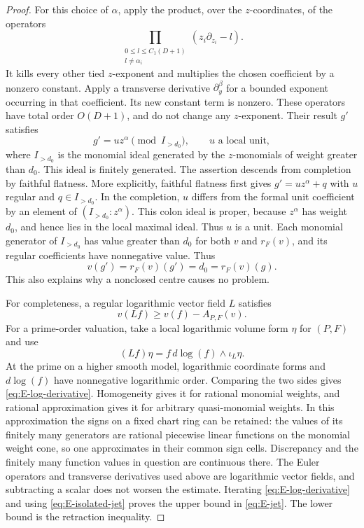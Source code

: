 \begin{proof}
For this choice of $\alpha$, apply the product, over the $z$-coordinates,
of the operators
\[
 \prod_{\substack{0\le l\le C_1(D+1)\\ l\ne\alpha_i}}
             (z_i\partial_{z_i}-l).
\]
It kills every other tied $z$-exponent and multiplies the chosen
coefficient by a nonzero constant. Apply a transverse derivative
$\partial_y^\beta$ for a bounded exponent occurring in that coefficient.
Its new constant term is nonzero. These operators have total order
$O(D+1)$, and do not change any $z$-exponent. Their result $g'$ satisfies
\begin{equation}\label{eq:E-isolated-jet}
 g'=u z^\alpha\pmod{I_{>d_0}},\qquad u\text{ a local unit},
\end{equation}
where $I_{>d_0}$ is the monomial ideal generated by the $z$-monomials
of weight greater than $d_0$. This ideal is finitely generated.
The assertion descends from completion by faithful flatness. More
explicitly, faithful flatness first gives $g'=u z^\alpha+q$ with
$u$ regular and $q\in I_{>d_0}$. In the completion, $u$ differs from
the formal unit coefficient by an element of $(I_{>d_0}:z^\alpha)$.
This colon ideal is proper, because $z^\alpha$ has weight $d_0$,
and hence lies in the local maximal ideal. Thus $u$ is a unit.
Each monomial generator of $I_{>d_0}$ has value greater than $d_0$
for both $v$ and $r_F(v)$, and its regular coefficients have nonnegative
value. Thus
\[
 v(g')=r_F(v)(g')=d_0=r_F(v)(g).
\]
This also explains why a nonclosed centre causes no problem.

For completeness, a regular logarithmic vector field $L$ satisfies
\begin{equation}\label{eq:E-log-derivative}
 v(Lf)\ge v(f)-A_{P,F}(v).
\end{equation}
For a prime-order valuation, take a local logarithmic volume form
$\eta$ for $(P,F)$ and use
\[
 (Lf)\eta=f\,d\log(f)\wedge\iota_L\eta.
\]
At the prime on a higher smooth model, logarithmic coordinate forms
and $d\log(f)$ have nonnegative logarithmic order. Comparing the two
sides gives \eqref{eq:E-log-derivative}. Homogeneity gives it for rational
monomial weights, and rational approximation gives it for arbitrary
quasi-monomial weights. In this approximation the signs on a fixed
chart ring can be retained: the values of its finitely many generators
are rational piecewise linear functions on the monomial weight cone,
so one approximates in their common sign cells. Discrepancy and the
finitely many function values in question are continuous there.
The Euler operators and transverse derivatives used above are
logarithmic vector fields, and subtracting a scalar does not worsen
the estimate. Iterating \eqref{eq:E-log-derivative} and using
\eqref{eq:E-isolated-jet} proves the upper bound in \eqref{eq:E-jet}.
The lower bound is the retraction inequality.
\end{proof}

